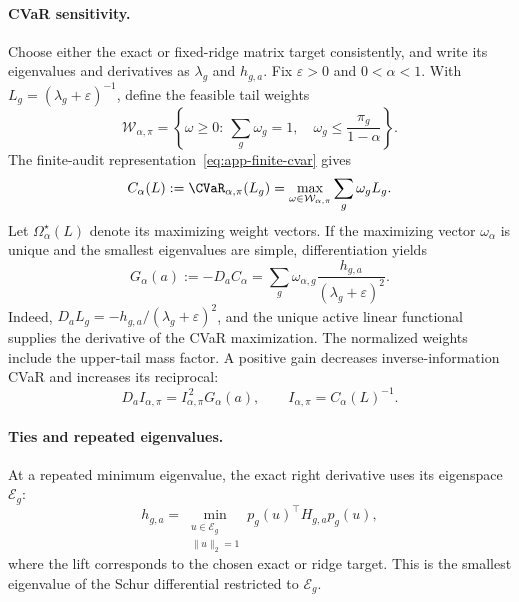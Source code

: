 \paragraph{CVaR sensitivity.}
Choose either the exact or fixed-ridge matrix target consistently, and write its eigenvalues and derivatives as $\lambda_g$ and $h_{g,a}$. Fix $\varepsilon>0$ and $0<\alpha<1$. With $L_g=(\lambda_g+\varepsilon)^{-1}$, define the feasible tail weights
\begin{equation}
\mathcal W_{\alpha,\pi}
=\left\{\omega\ge0:\ \sum_g\omega_g=1,
\quad\omega_g\le\frac{\pi_g}{1-\alpha}\right\}.
\label{eq:influence-tail-weight-set}
\end{equation}
The finite-audit representation~\eqref{eq:app-finite-cvar} gives
\begin{equation}
C_\alpha(L):=\CVaR_{\alpha,\pi}(L_g)
=\max_{\omega\in\mathcal W_{\alpha,\pi}}\sum_g\omega_gL_g.
\label{eq:influence-cvar-dual}
\end{equation}
Let $\Omega_\alpha^\star(L)$ denote its maximizing weight vectors. If the maximizing vector $\omega_\alpha$ is unique and the smallest eigenvalues are simple, differentiation yields
\begin{equation}
\boxed{
G_\alpha(a):=-D_aC_\alpha
=\sum_g\omega_{\alpha,g}
\frac{h_{g,a}}{(\lambda_g+\varepsilon)^2}.
}
\label{eq:tail-information-gain}
\end{equation}
Indeed, $D_aL_g=-h_{g,a}/(\lambda_g+\varepsilon)^2$, and the unique active linear functional supplies the derivative of the CVaR maximization. The normalized weights include the upper-tail mass factor. A positive gain decreases inverse-information CVaR and increases its reciprocal:
\begin{equation}
D_aI_{\alpha,\pi}=I_{\alpha,\pi}^{\,2}G_\alpha(a),
\qquad I_{\alpha,\pi}=C_\alpha(L)^{-1}.
\label{eq:influence-certificate-derivative}
\end{equation}

\paragraph{Ties and repeated eigenvalues.}
At a repeated minimum eigenvalue, the exact right derivative uses its eigenspace $\mathcal E_g$:
\begin{equation}
h_{g,a}
=\min_{\substack{u\in\mathcal E_g\\\lVert u\rVert_2=1}}
p_g(u)^\top H_{g,a}p_g(u),
\label{eq:influence-repeated-eigenvalue}
\end{equation}
where the lift corresponds to the chosen exact or ridge target. This is the smallest eigenvalue of the Schur differential restricted to $\mathcal E_g$.

